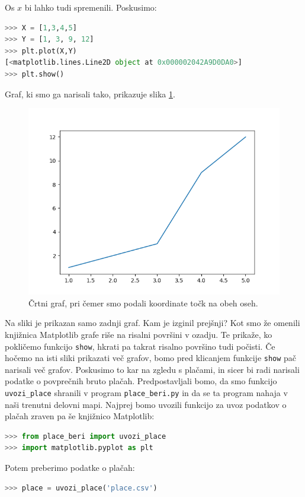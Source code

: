 Os $x$ bi lahko tudi spremenili. Poskusimo:
\begin{lstlisting}[language=Python, showstringspaces=false]
>>> X = [1,3,4,5]
>>> Y = [1, 3, 9, 12]
>>> plt.plot(X,Y)
[<matplotlib.lines.Line2D object at 0x000002042A9D0DA0>]
>>> plt.show()
\end{lstlisting}
Graf, ki smo ga narisali tako, prikazuje slika \ref{img:plt2}.
\begin{figure}
    \includegraphics[width=\linewidth]{img/plt2.png}
    \caption{Črtni graf, pri čemer smo podali koordinate točk na obeh oseh.}
    \label{img:plt2}
\end{figure}
Na sliki je prikazan samo zadnji graf. Kam je izginil prejšnji? Kot smo že omenili knjižnica Matplotlib grafe riše na risalni površini v ozadju. Te prikaže, ko pokličemo funkcijo \texttt{show}, hkrati pa takrat risalno površino tudi počisti. Če hočemo na isti sliki prikazati več grafov, bomo pred klicanjem funkcije \texttt{show} pač narisali več grafov. Poskusimo to kar na zgledu s plačami, in sicer bi radi narisali podatke o povprečnih bruto plačah. Predpostavljali bomo, da smo funkcijo \texttt{uvozi\_place} shranili v program \texttt{place\_beri.py} in da se ta program nahaja v naši trenutni delovni mapi. Najprej bomo uvozili funkcijo za uvoz podatkov o plačah zraven pa še knjižnico Matplotlib:
\begin{lstlisting}[language=Python, showstringspaces=false]
>>> from place_beri import uvozi_place
>>> import matplotlib.pyplot as plt
\end{lstlisting}
Potem preberimo podatke o plačah:
\begin{lstlisting}[language=Python]
>>> place = uvozi_place('place.csv')
\end{lstlisting}
